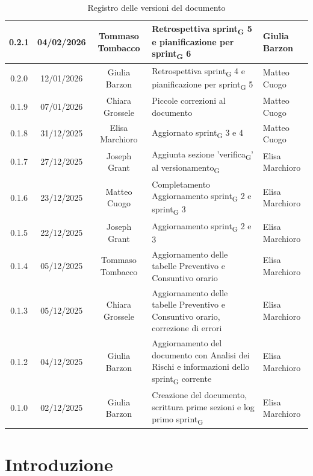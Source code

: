 \documentclass[11pt,a4paper]{article}
\newcommand{\gls}[1]{#1\textsubscript{G}}
\begin{document}
\begin{table}[H]
\begin{tabular}{|c|c|c|>{\raggedright\arraybackslash}p{}|p{}|}
        \hline
        0.2.1 & 04/02/2026 & Tommaso Tombacco & Retrospettiva \gls{sprint} 5 e pianificazione per \gls{sprint} 6 & Giulia Barzon\\
        \hline
        0.2.0 & 12/01/2026 & Giulia Barzon & Retrospettiva \gls{sprint} 4 e pianificazione per \gls{sprint} 5 & Matteo Cuogo\\
        \hline
        0.1.9 & 07/01/2026 & Chiara Grossele & Piccole correzioni al documento & Matteo Cuogo\\ 
        \hline
        0.1.8 & 31/12/2025 & Elisa Marchioro & Aggiornato \gls{sprint} 3 e 4 & Matteo Cuogo\\ \hline
        0.1.7 & 27/12/2025 & Joseph Grant & Aggiunta sezione '\gls{verifica}' al \gls{versionamento} & Elisa Marchioro\\ \hline
        0.1.6 & 23/12/2025 & Matteo Cuogo & Completamento Aggiornamento \gls{sprint} 2 e \gls{sprint} 3 & Elisa Marchioro\\
        \hline
        0.1.5 & 22/12/2025 & Joseph Grant & Aggiornamento \gls{sprint} 2 e 3 & Elisa Marchioro\\
        \hline
        0.1.4 & 05/12/2025 & Tommaso Tombacco & Aggiornamento delle tabelle Preventivo e Consuntivo orario & Elisa Marchioro\\
        \hline
        0.1.3 & 05/12/2025 & Chiara Grossele & Aggiornamento delle tabelle Preventivo e Consuntivo orario, correzione di errori & Elisa Marchioro\\
        \hline
        0.1.2 & 04/12/2025 & Giulia Barzon & Aggiornamento del documento con Analisi dei Rischi e informazioni dello \gls{sprint} corrente & Elisa Marchioro\\
        \hline
        0.1.0 & 02/12/2025 & Giulia Barzon & Creazione del documento, scrittura prime sezioni e log primo \gls{sprint} & Elisa Marchioro\\
        \hline
    \end{tabular}
    \caption{Registro delle versioni del documento}
    \label{tab:versionamento}
\end{table}

\newpage

\tableofcontents
\thispagestyle{empty}
\newpage

\setcounter{page}{1}

\section{Introduzione}
\end{document}
